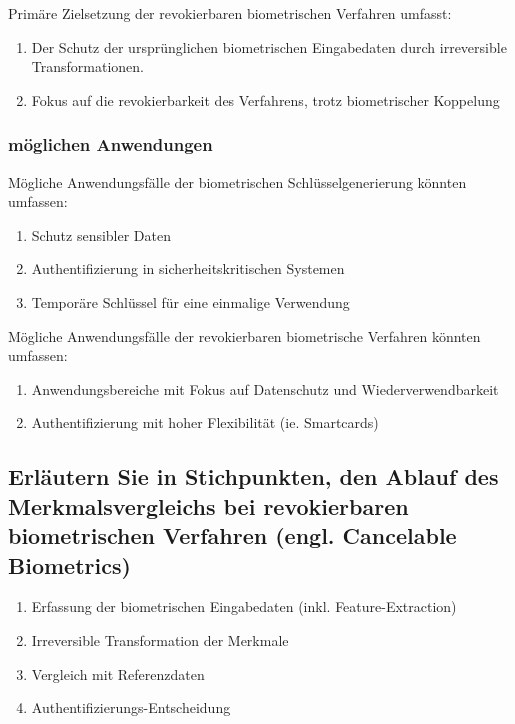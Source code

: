 \documentclass{article}
\begin{document}
Primäre Zielsetzung der revokierbaren biometrischen Verfahren umfasst:

\begin{enumerate}
	\item Der Schutz der ursprünglichen biometrischen Eingabedaten durch irreversible Transformationen.
	\item Fokus auf die revokierbarkeit des Verfahrens, trotz biometrischer Koppelung
\end{enumerate}

\subsubsection{möglichen Anwendungen}

Mögliche Anwendungsfälle der biometrischen Schlüsselgenerierung könnten umfassen:

\begin{enumerate}
	\item Schutz sensibler Daten 
	\item Authentifizierung in sicherheitskritischen Systemen
	\item Temporäre Schlüssel für eine einmalige Verwendung
\end{enumerate}

Mögliche Anwendungsfälle der revokierbaren biometrische Verfahren könnten umfassen:

\begin{enumerate}
	\item Anwendungsbereiche mit Fokus auf Datenschutz und Wiederverwendbarkeit
	\item Authentifizierung mit hoher Flexibilität (ie. Smartcards)
\end{enumerate}	

\subsection{Erläutern Sie in Stichpunkten, den Ablauf des Merkmalsvergleichs bei revokierbaren biometrischen Verfahren (engl. Cancelable Biometrics)}

\begin{enumerate}
    \item Erfassung der biometrischen Eingabedaten (inkl. Feature-Extraction)
    \item Irreversible Transformation der Merkmale
    \item Vergleich mit Referenzdaten
    \item Authentifizierungs-Entscheidung
\end{enumerate}
\end{document}
